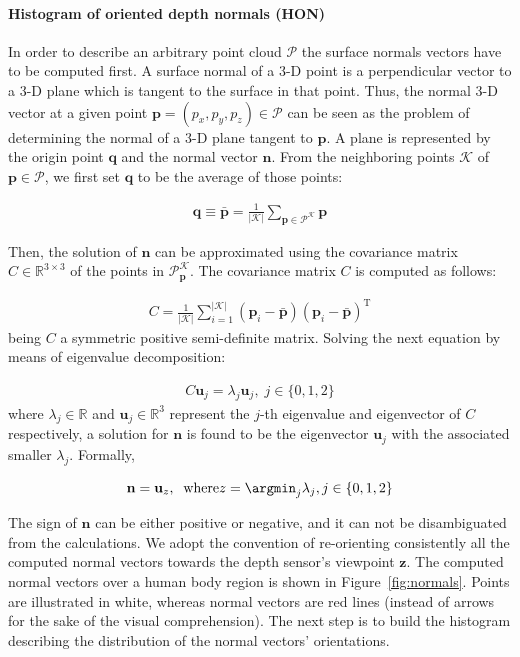 \documentclass[10pt,twocolumn,letterpaper]{article}
\begin{document}
\paragraph{Histogram of oriented depth normals (HON)} 
In order to describe an arbitrary point cloud $\mathcal{P}$ the surface normals vectors have to be computed first. A surface normal of a 3-D point is a perpendicular vector to a 3-D plane which is tangent to the surface in that point. Thus, the normal 3-D vector at a given point $\mathbf{p} = (p_x, p_y, p_z) \in \mathcal{P}$ can be seen as the problem of determining the normal of a 3-D plane tangent to $\mathbf{p}$. A plane is represented by the origin point $\mathbf{q}$ and the normal vector $\mathbf{n}$. From the neighboring points $\mathcal{K}$ of $\mathbf{p} \in \mathcal{P}$, we first set $\mathbf{q}$ to be the average of those points:

\begin{gather}
	\mathbf{q} \equiv \bar{\mathbf{p}} = \frac{1}{|\mathcal{K}|} \sum_{\mathbf{p} \in \mathcal{P}^{\mathcal{K}}} \mathbf{p}
\end{gather}
 
Then, the solution of $\mathbf{n}$ can be approximated using the covariance matrix $C \in \mathbb{R}^{3 \times 3}$ of the points in $\mathcal{P}_\mathbf{p}^{\mathcal{K}}$. The covariance matrix $C$ is computed as follows: 

\begin{gather}
	C = \frac{1}{|\mathcal{K}|} \sum_{i=1}^{|\mathcal{K}|} (\mathbf{p}_i - \bar{\mathbf{p}}) (\mathbf{p}_i - \bar{\mathbf{p}})^{\mathrm{T}}
\end{gather}
being $C$ a symmetric positive semi-definite matrix. Solving the next equation by means of eigenvalue decomposition:

\begin{gather}
	C \mathbf{u}_j = \lambda_j \mathbf{u}_j, \; j \in \{0,1,2\}
\end{gather}
where $\lambda_j \in \mathbb{R}$ and $\mathbf{u}_j \in \mathbb{R}^3$ represent the $j$-th eigenvalue and eigenvector of $C$ respectively, a solution for $\mathbf{n}$ is found to be the eigenvector $\mathbf{u}_j$ with the associated smaller $\lambda_j$. Formally,

\begin{gather}
	\mathbf{n} = \mathbf{u}_z, \;\; \mathrm{where}  z = \argmin_{j}{\lambda_j}, j \in \{0,1,2\}
\end{gather}

The sign of $\mathbf{n}$ can be either positive or negative, and it can not be disambiguated from the calculations. We adopt the convention of re-orienting consistently all the computed normal vectors towards the depth sensor's viewpoint $\mathbf{z}$. The computed normal vectors over a human body region is shown in Figure~\ref{fig:normals}. Points are illustrated in white, whereas normal vectors are red lines (instead of arrows for the sake of the visual comprehension). The next step is to build the histogram describing the distribution of the normal vectors' orientations.
\end{document}
